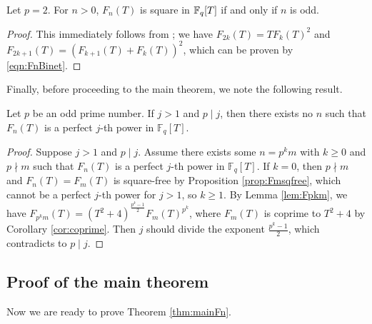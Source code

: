 \begin{proposition}
    \label{prop:Fmp2sq}
    Let \(p = 2\). For $n > 0$, \(F_n(T)\) is square in \(\mathbb{F}_q[T]\) if and only if \(n\) is odd.
\end{proposition}
\begin{proof}
    This immediately follows from \cite[Lemma 3.5]{kitayama2017irreducibility}; we have \(F_{2k}(T) = T F_k(T)^2\) and \(F_{2k+1}(T) = (F_{k+1}(T) + F_k(T))^2\), which can be proven by \eqref{eqn:FnBinet}.
\end{proof}

Finally, before proceeding to the main theorem, we note the following result.

\begin{theorem}
    \label{thm:Fnnonpower}
    Let $p$ be an odd prime number. If $j > 1$ and $p \mid j$, then there exists no $n$ such that $F_n(T)$ is a perfect $j$-th power in $\mathbb{F}_q[T]$.
\end{theorem}

\begin{proof}
    Suppose $j > 1$ and $p \mid j$. Assume there exists some $n = p^km$ with $k \geq 0$ and $p \nmid m$ such that $F_n(T)$ is a perfect $j$-th power in $\mathbb{F}_q[T]$. 
    If $k = 0$, then $p \nmid m$ and $F_n(T) = F_m(T)$ is square-free by Proposition \ref{prop:Fmsqfree}, which cannot be a perfect $j$-th power for $j > 1$, so $k \ge 1$.
    By Lemma \ref{lem:Fpkm}, we have $F_{p^k m}(T) = (T^2 + 4)^{\frac{p^k - 1}{2}} F_m(T)^{p^k}$, where $F_m(T)$ is coprime to $T^2 + 4$ by Corollary \ref{cor:coprime}.
    Then $j$ should divide the exponent $\frac{p^k - 1}{2}$, which contradicts to $p \mid j$.
\end{proof}

\subsection{Proof of the main theorem}

Now we are ready to prove Theorem \ref{thm:mainFn}.

